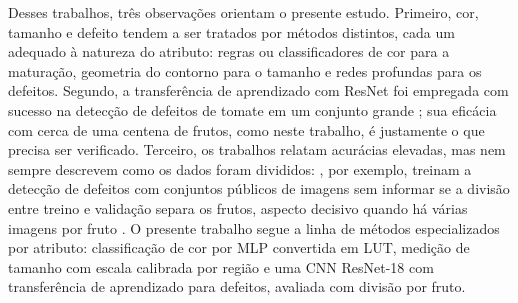 Desses trabalhos, três observações orientam o presente estudo. Primeiro, cor, tamanho e defeito tendem a ser tratados por métodos distintos, cada um adequado à natureza do atributo: regras ou classificadores de cor para a maturação, geometria do contorno para o tamanho e redes profundas para os defeitos. Segundo, a transferência de aprendizado com ResNet foi empregada com sucesso na detecção de defeitos de tomate em um conjunto grande \cite{dacosta2020}; sua eficácia com cerca de uma centena de frutos, como neste trabalho, é justamente o que precisa ser verificado. Terceiro, os trabalhos relatam acurácias elevadas, mas nem sempre descrevem como os dados foram divididos: \textcite{hou2024}, por exemplo, treinam a detecção de defeitos com conjuntos públicos de imagens sem informar se a divisão entre treino e validação separa os frutos, aspecto decisivo quando há várias imagens por fruto \cite{kapoor2023}. O presente trabalho segue a linha de métodos especializados por atributo: classificação de cor por MLP convertida em LUT, medição de tamanho com escala calibrada por região e uma CNN ResNet-18 com transferência de aprendizado para defeitos, avaliada com divisão por fruto.